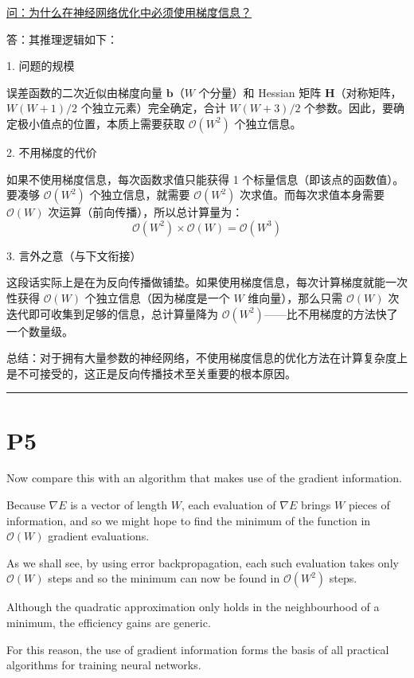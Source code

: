 \documentclass{article}
\begin{document}
{\color{blue}
\underline{问：为什么在神经网络优化中必须使用梯度信息？}

答：其推理逻辑如下：

1. 问题的规模

误差函数的二次近似由梯度向量 $\mathbf{b}$（$W$ 个分量）和 Hessian 矩阵 $\mathbf{H}$（对称矩阵，$W(W+1)/2$ 个独立元素）完全确定，合计 $W(W+3)/2$ 个参数。因此，要确定极小值点的位置，本质上需要获取 $\mathcal{O}(W^2)$ 个独立信息。

2. 不用梯度的代价

如果不使用梯度信息，每次函数求值只能获得 1 个标量信息（即该点的函数值）。要凑够 $\mathcal{O}(W^2)$ 个独立信息，就需要 $\mathcal{O}(W^2)$ 次求值。而每次求值本身需要 $\mathcal{O}(W)$ 次运算（前向传播），所以总计算量为：
$$\mathcal{O}(W^2) \times \mathcal{O}(W) = \mathcal{O}(W^3)$$

3. 言外之意（与下文衔接）

这段话实际上是在为反向传播做铺垫。如果使用梯度信息，每次计算梯度就能一次性获得 $\mathcal{O}(W)$ 个独立信息（因为梯度是一个 $W$ 维向量），那么只需 $\mathcal{O}(W)$ 次迭代即可收集到足够的信息，总计算量降为 $\mathcal{O}(W^2)$——比不用梯度的方法快了一个数量级。

总结：对于拥有大量参数的神经网络，不使用梯度信息的优化方法在计算复杂度上是不可接受的，这正是反向传播技术至关重要的根本原因。
}

\noindent\rule{\linewidth}{0.4pt}

\section{P5}

Now compare this with an algorithm that makes use of the gradient information. 

Because $\nabla E$ is a vector of length $W$, each evaluation of $\nabla E$ brings $W$ pieces of information, and so we might hope to find the minimum of the function in $\mathcal{O}(W)$ gradient evaluations. 

As we shall see, by using error backpropagation, each such evaluation takes only $\mathcal{O}(W)$ steps and so the minimum can now be found in $\mathcal{O}(W^2)$ steps. 

Although the quadratic approximation only holds in the neighbourhood of a minimum, the efficiency gains are generic. 

For this reason, the use of gradient information forms the basis of all practical algorithms for training neural networks.
\end{document}
